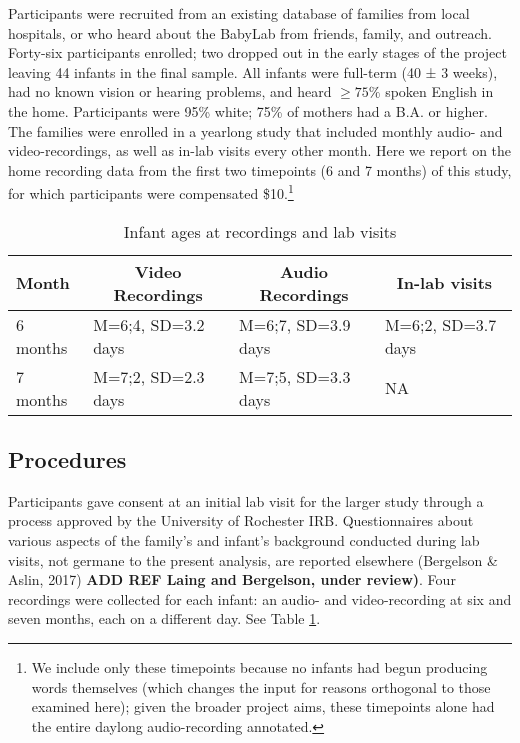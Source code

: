\documentclass[floatsintext,man]{apa6}
\theoremstyle{definition}
\theoremstyle{definition}
\theoremstyle{definition}
\theoremstyle{remark}
\begin{document}
Participants were recruited from an existing database of families from
local hospitals, or who heard about the BabyLab from friends, family,
and outreach. Forty-six participants enrolled; two dropped out in the
early stages of the project leaving 44 infants in the final sample. All
infants were full-term (40 ± 3 weeks), had no known vision or hearing
problems, and heard \(\geq 75\%\) spoken English in the home.
Participants were 95\% white; 75\% of mothers had a B.A. or higher. The
families were enrolled in a yearlong study that included monthly audio-
and video-recordings, as well as in-lab visits every other month. Here
we report on the home recording data from the first two timepoints (6
and 7 months) of this study, for which participants were compensated
\$10.\footnote{We include only these timepoints because no infants had begun producing words themselves (which changes the input for reasons orthogonal to those examined here); given the broader project aims, these timepoints alone had the entire daylong audio-recording annotated.}

\begin{table}[tbp]
\begin{center}
\begin{threeparttable}
\caption{\label{tab:recording-ages-table}Infant ages at recordings and lab visits}
\begin{tabular}{llll}
\toprule
Month & \multicolumn{1}{c}{Video Recordings} & \multicolumn{1}{c}{Audio Recordings} & \multicolumn{1}{c}{In-lab visits}\\
\midrule
6 months & M=6;4, SD=3.2 days & M=6;7, SD=3.9 days & M=6;2, SD=3.7 days\\
7 months & M=7;2, SD=2.3 days & M=7;5, SD=3.3 days & NA\\
\bottomrule
\end{tabular}
\end{threeparttable}
\end{center}
\end{table}

\subsection{Procedures}\label{procedures}

Participants gave consent at an initial lab visit for the larger study
through a process approved by the University of Rochester IRB.
Questionnaires about various aspects of the family's and infant's
background conducted during lab visits, not germane to the present
analysis, are reported elsewhere (Bergelson \& Aslin, 2017) \textbf{ADD
REF Laing and Bergelson, under review)}. Four recordings were collected
for each infant: an audio- and video-recording at six and seven months,
each on a different day. See Table \ref{tab:recording-ages-table}.
\end{document}
